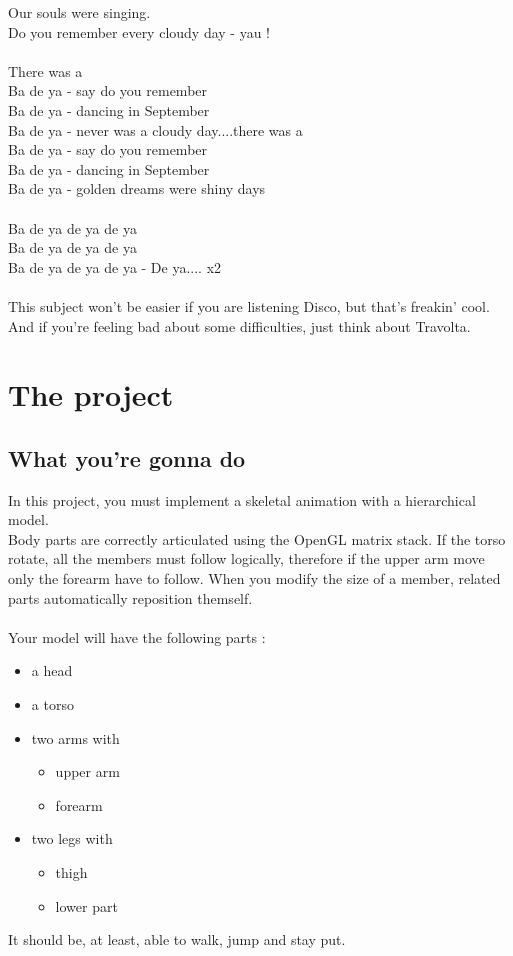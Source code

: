 \documentclass{42}
\begin{document}
{Our souls were singing.\\
Do you remember every cloudy day - yau !\\
\\
There was a\\
Ba de ya - say do you remember\\
Ba de ya - dancing in September\\
Ba de ya - never was a cloudy day....there was a\\
Ba de ya - say do you remember\\
Ba de ya - dancing in September\\
Ba de ya - golden dreams were shiny days\\
\\
Ba de ya de ya de ya\\
Ba de ya de ya de ya\\
Ba de ya de ya de ya - De ya.... {x2}\\
\\
This subject won't be easier if you are listening Disco, but that's freakin' cool.\\
And if you're feeling bad about some difficulties, just think about Travolta.

}

\chapter{The project}
\section{What you're gonna do}

In this project, you must implement a skeletal animation with a hierarchical model.\\
Body parts are correctly articulated using the OpenGL matrix stack. If the torso rotate, all the members must follow logically, therefore if the upper arm move only the forearm have to follow. When you modify the size of a member, related parts automatically reposition themself.\\
\\
Your model will have the following parts :\\
\begin{itemize}
	\item a head
	\item a torso
	\item two arms with
	\begin{itemize}
		\item upper arm
		\item forearm
	\end{itemize}
	\item two legs with
	\begin{itemize}
		\item thigh
		\item lower part\\
	\end{itemize}
\end{itemize}
{
\noindent
It should be, at least, able to walk, jump and stay put.
}
\newpage
\end{document}
